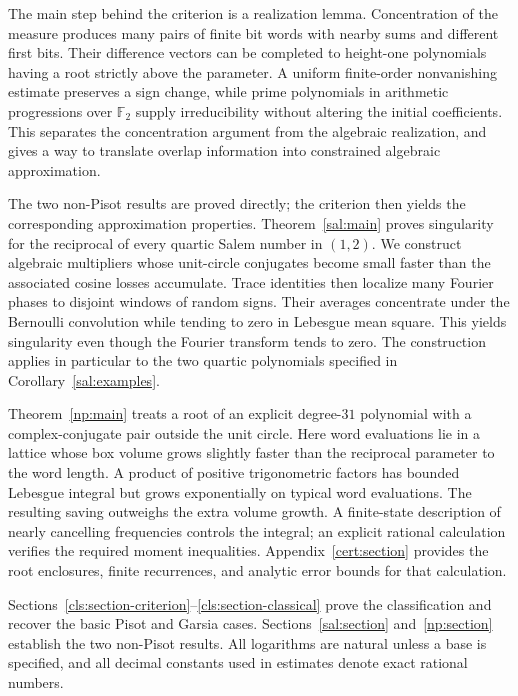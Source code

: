\documentclass[11pt]{article}
\theoremstyle{definition}
\theoremstyle{remark}
\numberwithin{equation}{section}
\begin{document}
The main step behind the criterion is a realization lemma. Concentration of the measure produces many pairs of finite bit words with nearby sums and different first bits. Their difference vectors can be completed to height-one polynomials having a root strictly above the parameter. A uniform finite-order nonvanishing estimate preserves a sign change, while prime polynomials in arithmetic progressions over $\mathbb F_2$ supply irreducibility without altering the initial coefficients. This separates the concentration argument from the algebraic realization, and gives a way to translate overlap information into constrained algebraic approximation.

The two non-Pisot results are proved directly; the criterion then yields the corresponding approximation properties. Theorem~\ref{sal:main} proves singularity for the reciprocal of every quartic Salem number in $(1,2)$. We construct algebraic multipliers whose unit-circle conjugates become small faster than the associated cosine losses accumulate. Trace identities then localize many Fourier phases to disjoint windows of random signs. Their averages concentrate under the Bernoulli convolution while tending to zero in Lebesgue mean square. This yields singularity even though the Fourier transform tends to zero. The construction applies in particular to the two quartic polynomials specified in Corollary~\ref{sal:examples}.

Theorem~\ref{np:main} treats a root of an explicit degree-$31$ polynomial with a complex-conjugate pair outside the unit circle. Here word evaluations lie in a lattice whose box volume grows slightly faster than the reciprocal parameter to the word length. A product of positive trigonometric factors has bounded Lebesgue integral but grows exponentially on typical word evaluations. The resulting saving outweighs the extra volume growth. A finite-state description of nearly cancelling frequencies controls the integral; an explicit rational calculation verifies the required moment inequalities. Appendix~\ref{cert:section} provides the root enclosures, finite recurrences, and analytic error bounds for that calculation.

Sections~\ref{cls:section-criterion}--\ref{cls:section-classical} prove the classification and recover the basic Pisot and Garsia cases. Sections~\ref{sal:section} and~\ref{np:section} establish the two non-Pisot results. All logarithms are natural unless a base is specified, and all decimal constants used in estimates denote exact rational numbers.




\appendix

\begingroup\small


\endgroup
\end{document}
